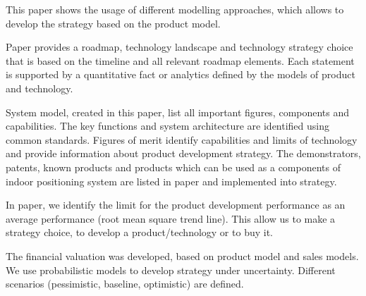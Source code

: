 This paper shows the usage of different modelling approaches, which allows to develop the strategy based on the product model.

Paper provides a roadmap, technology landscape and technology strategy choice that is based on the timeline and all relevant roadmap elements.
Each statement is supported by a quantitative fact or analytics defined by the models of product and technology.

System model, created in this paper, list all important figures, components and capabilities. The key functions and system architecture are identified using common standards. Figures of merit identify capabilities and limits of technology and provide information about product development strategy. The demonstrators, patents, known products and products which can be used as a components of indoor positioning system are listed in paper and implemented into strategy.

In paper, we identify the limit for the product development performance as an average performance (root mean square trend line). This allow us to make a strategy choice, to develop a product/technology or to buy it.

The financial valuation was developed, based on product model and sales models.
We use probabilistic models to develop strategy under uncertainty. Different scenarios (pessimistic, baseline, optimistic) are defined.
